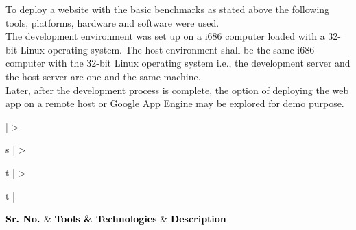 \documentclass[hidelinks,a4paper,12pt]{article}
\begin{document}
\noindent
To deploy a website with the basic benchmarks as stated above the following tools, platforms, hardware and software were used.
\\

The development environment was set up on a \gls{i686} computer loaded with a 32-bit \Gls{Linux} operating system. The host environment shall be the same \gls{i686} computer with the 32-bit \Gls{Linux} operating system i.e., the development server and the host server are one and the same machine.
\\

Later, after the development process is complete, the option of deploying the web app on a remote host or Google App Engine may be explored for demo purpose.

\bigskip

\noindent
\begin{center}
	{
	\setlength{\extrarowheight}{2pt}

	\newcolumntype{b}{X}
		
	\renewcommand\thetable{2} 					
	 \label{table:2}
	\vspace{0.25cm}
									
	\begin{tabularx}{\textwidth}{ | >{\ttfamily\raggedright\arraybackslash} s 
	| >{\ttfamily\raggedright\arraybackslash} t 
	| >{\ttfamily\raggedright\arraybackslash} t | }
								
	\hline
								
	{\textbf{\textcolor{black}{{Sr. No.} \newline}}} & {\textbf{\textcolor{black}{ {Tools \& Technologies}}}} & \textbf{\textcolor{black}{ {Description}}} \\
								

\end{tabularx}}
\end{center}
\end{document}
